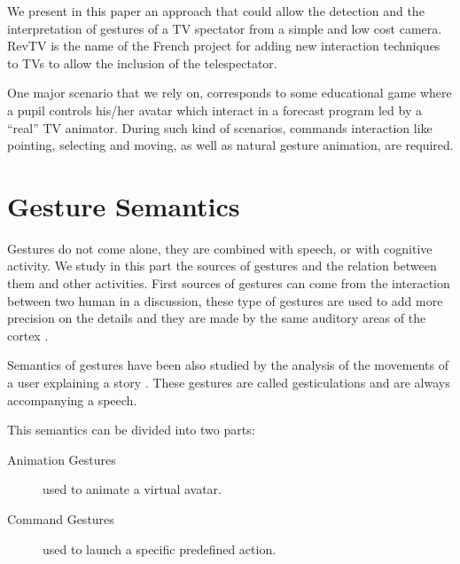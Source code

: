 \documentclass{llncs}
\newcommand\ignore[1]{}
\begin{document}
We present in this paper an approach that could allow the detection and the
interpretation of gestures of a TV spectator from a simple and low cost camera. 
RevTV is the name of the French project for adding new interaction techniques
to TVs to allow the inclusion of the telespectator.

One major scenario that we rely on, corresponds to some educational game where a pupil
controls his/her avatar which interact in a forecast program led by a ``real'' TV animator.
During such kind of scenarios, commands interaction
like pointing, selecting and moving, as well as natural gesture animation, are required.

\ignore{
Its major scenario which we rely on, corresponds to educational games where a
pupil controls his/her avatar in a program led by a ``real'' TV animator.
This kind of scenarios needs to be able to manage commands interaction
like pointing, selecting and moving as well as natural gesture animation.
}

\section{Gesture Semantics}
Gestures do not come alone, they are combined with speech, or with cognitive
activity. We study in this part the sources of gestures and the relation between
them and other activities.
First sources of gestures can come from the interaction between two human in a
discussion, these type of gestures are used to add more precision on the details
and they are made by the same auditory areas of the cortex \cite{SymbolicGest}.

Semantics of gestures have been also studied by the analysis of the movements of
a user explaining a story \cite{gestureThought}.
These gestures are called gesticulations and are always accompanying a speech. 

This semantics can be divided into two parts:
\begin{description}
 \item[Animation Gestures] used to animate a virtual avatar.
 \item[Command Gestures] used to launch a specific predefined action.
\end{description}
\end{document}
